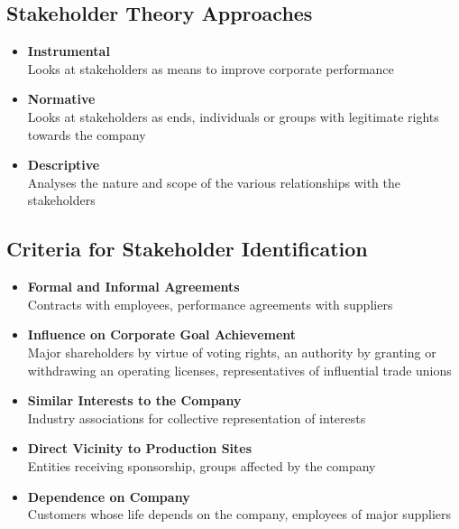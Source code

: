 \documentclass[11pt]{article}
\theoremstyle{definition}
\begin{document}
\subsection{Stakeholder Theory Approaches}
\begin{itemize}
	\item \textbf{Instrumental}\\
	Looks at stakeholders as means to improve corporate performance
	\item \textbf{Normative}\\
	Looks at stakeholders as ends, individuals or groups with legitimate rights towards the company
	\item \textbf{Descriptive}\\
	Analyses the nature and scope of the various relationships with the stakeholders
\end{itemize}
\parencite{donaldson1995stakeholder}

\subsection{Criteria for Stakeholder Identification}
\begin{itemize}[label=-]
	\item \textbf{Formal and Informal Agreements}\\
	Contracts with employees, performance agreements with suppliers
	\item \textbf{Influence on Corporate Goal Achievement}\\
	Major shareholders by virtue of voting rights, an authority by granting or withdrawing an operating licenses, representatives of influential trade unions
	\item \textbf{Similar Interests to the Company}\\
	Industry associations for collective representation of interests
	\item \textbf{Direct Vicinity to Production Sites}\\
	Entities receiving sponsorship, groups affected by the company
	\item \textbf{Dependence on Company}\\
	Customers whose life depends on the company, employees of major suppliers
\end{itemize}
\end{document}
